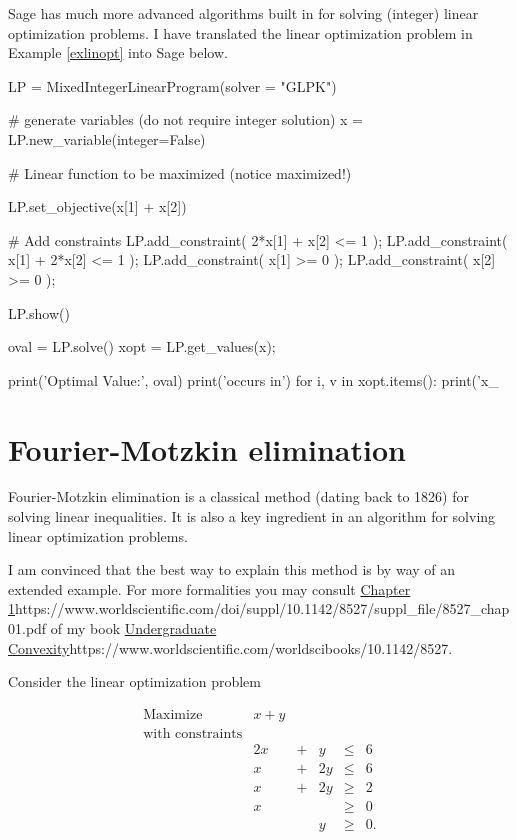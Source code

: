 \documentclass{article}
\begin{document}
  Sage has much more advanced algorithms built in for solving (integer) linear optimization
  problems. I have translated the linear optimization problem in Example \ref{exlinopt} into
  Sage below.

\begin{example}\label{sageLP}
\begin{sage}
LP = MixedIntegerLinearProgram(solver = "GLPK")
 
# generate variables (do not require integer solution) 
x = LP.new_variable(integer=False)
 
# Linear function to be maximized (notice maximized!)

LP.set_objective(x[1] + x[2])
    
# Add constraints
LP.add_constraint( 2*x[1] + x[2] <= 1 );
LP.add_constraint( x[1] + 2*x[2] <= 1 );
LP.add_constraint( x[1] >= 0 );
LP.add_constraint( x[2] >= 0 );

 
LP.show()
 
oval = LP.solve()
xopt = LP.get_values(x);
 
print('Optimal Value:', oval)
print('occurs in')
for i, v in xopt.items():
    print('x_%
\end{sage}
\end{example}  


\section{Fourier-Motzkin elimination}

Fourier-Motzkin elimination is a classical method (dating back to 1826) for solving linear inequalities. 
It is also a key ingredient in an algorithm for solving linear optimization problems.

I am convinced that
the best way to explain this method is by way of an extended example. For more formalities you may
consult \url{Chapter 1}{https://www.worldscientific.com/doi/suppl/10.1142/8527/suppl_file/8527_chap01.pdf} of my book \url{Undergraduate Convexity}{https://www.worldscientific.com/worldscibooks/10.1142/8527}.

Consider the linear optimization problem

\begin{equation}\label{optfmex}
  \begin{array}{llrrrr}
    \text{Maximize} &x + y\\
    \text{with constraints}\\
    &2 x &+ &y &\leq &6\\
    &x &+ &2 y &\leq &6\\
    &x &+ &2 y &\geq &2\\
    &x && &\geq &0\\
    &&&y &\geq &0.
  \end{array}
\end{equation}
  
\end{document}
